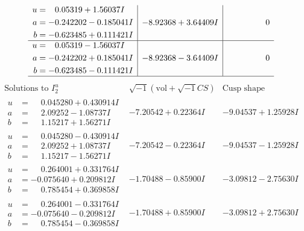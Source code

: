 \documentclass[1p]{elsarticle_modified}
\theoremstyle{definition}
\newcommand{\I}{\sqrt{-1}}
\begin{document}
$$\begin{array}{c|c|c}
\begin{aligned}
u &= \phantom{-}0.05319 + 1.56037 I \\
a &= -0.242202 - 0.185041 I \\
b &= -0.623485 + 0.111421 I\end{aligned}
 & -8.92368 + 3.64409 I & \phantom{-0.000000 } 0 \\ \hline\begin{aligned}
u &= \phantom{-}0.05319 - 1.56037 I \\
a &= -0.242202 + 0.185041 I \\
b &= -0.623485 - 0.111421 I\end{aligned}
 & -8.92368 - 3.64409 I & \phantom{-0.000000 } 0\\
 \hline 
 \end{array}$$\newpage$$\begin{array}{c|c|c}  
\text{Solutions to }I^u_{2}& \I (\text{vol} + \sqrt{-1}CS) & \text{Cusp shape}\\
 \hline 
\begin{aligned}
u &= \phantom{-}0.045280 + 0.430914 I \\
a &= \phantom{-}2.09252 - 1.08737 I \\
b &= \phantom{-}1.15217 + 1.56271 I\end{aligned}
 & -7.20542 + 0.22364 I & -9.04537 + 1.25928 I \\ \hline\begin{aligned}
u &= \phantom{-}0.045280 - 0.430914 I \\
a &= \phantom{-}2.09252 + 1.08737 I \\
b &= \phantom{-}1.15217 - 1.56271 I\end{aligned}
 & -7.20542 - 0.22364 I & -9.04537 - 1.25928 I \\ \hline\begin{aligned}
u &= \phantom{-}0.264001 + 0.331764 I \\
a &= -0.075640 + 0.209812 I \\
b &= \phantom{-}0.785454 + 0.369858 I\end{aligned}
 & -1.70488 - 0.85900 I & -3.09812 - 2.75630 I \\ \hline\begin{aligned}
u &= \phantom{-}0.264001 - 0.331764 I \\
a &= -0.075640 - 0.209812 I \\
b &= \phantom{-}0.785454 - 0.369858 I\end{aligned}
 & -1.70488 + 0.85900 I & -3.09812 + 2.75630 I \\ \hline\begin{aligned}

\end{aligned}
\end{array}$$
\end{document}
